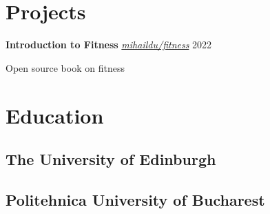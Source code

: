 \documentclass[]{plushcv}
\begin{document}
\begin{minipage}[t]{0.25\textwidth}

\section{Projects} 
\textbf{Introduction to Fitness} \normalfont\textit{\href{https://github.com/mihaildu/fitness}{mihaildu/fitness}} 2022

Open source book on fitness
\sectionsep


\section{Education} 
\subsection{The University of Edinburgh}

\sectionsep
\subsection{Politehnica University of Bucharest}

\end{minipage} 
\end{document}
